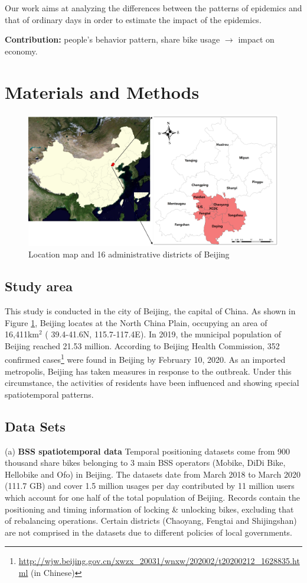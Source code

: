 \documentclass[preprints,ijgi,submit,moreauthors]{Definitions/mdpi}
\begin{document}
Our work aims at analyzing the differences between the patterns of epidemics and that of ordinary days in order to estimate the impact of the epidemics.

\textbf{Contribution:} people's behavior pattern, share bike usage $\to$ impact on economy.

\section{Materials and Methods}

\begin{figure}[H]
    \centering
    \includegraphics[width=\textwidth]{Definitions/StudyArea.png}
    \caption{Location map and 16 administrative districts of Beijing}
    \label{fig:study_area}
\end{figure}

\subsection{Study area}
This study is conducted in the city of Beijing, the capital of China. 
As shown in Figure \ref{fig:study_area}, Beijing locates at the North China Plain, occupying an area of 16,411km$^2$ ( 39.4{\degree}-41.6{\degree}N, 115.7{\degree}-117.4{\degree}E). 
In 2019, the municipal population of Beijing reached 21.53 million. According to Beijing Health Commission, 352 confirmed cases\footnote{\url{http://wjw.beijing.gov.cn/xwzx_20031/wnxw/202002/t20200212_1628835.html} (in Chinese)} were found in Beijing by February 10, 2020. 
As an imported metropolis, Beijing has taken measures in response to the outbreak. 
Under this circumstance, the activities of residents have been influenced and showing special spatiotemporal patterns.

\subsection{Data Sets}
(a) \textbf{BSS spatiotemporal data} Temporal positioning datasets come from 900 thousand share bikes belonging to 3 main BSS operators (Mobike, DiDi Bike, Hellobike and Ofo) in Beijing.
The datasets date from March 2018 to March 2020 (111.7 GB) and cover 1.5 million usages per day contributed by 11 million users which account for one half of the total population of Beijing.
Records contain the positioning and timing information of locking \& unlocking bikes, excluding that of rebalancing operations.
Certain districts (Chaoyang, Fengtai and Shijingshan) are not comprised in the datasets due to different policies of local governments.
\end{document}
